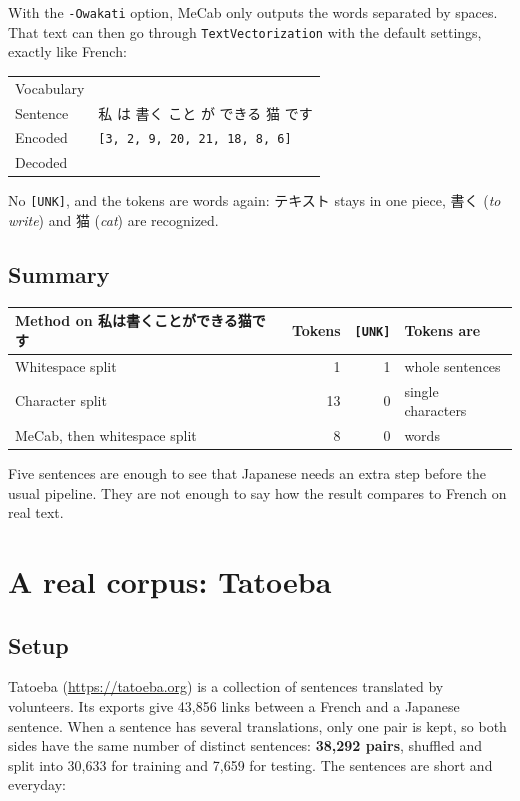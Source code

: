 \documentclass[11pt,a4paper]{article}
\makeatletter
\newcommand\code[1]{\texttt{#1}}
\newenvironment{result}
  {\par\smallskip\noindent\begin{tabular}{@{}l p{0.78\textwidth}@{}}}
  {\end{tabular}\par\smallskip}
\newcommand\row[2]{\textsf{\small\color{muted}#1} & #2 \\[3pt]}
\makeatother
\begin{document}
With the \code{-Owakati} option, MeCab only outputs the words separated by
spaces. That text can then go through \code{TextVectorization} with the default
settings, exactly like French:

\begin{result}
  \row{Vocabulary}{\tokens[ja]{UNK|は|私|我|テキスト|です|あり|猫|書く|思う|別|作家|ん|ゆえ|ませ|の|に|できる|で|こと|が|、}}
  \row{Sentence}{私 は 書く こと が できる 猫 です}
  \row{Encoded}{\code{[3, 2, 9, 20, 21, 18, 8, 6]}}
  \row{Decoded}{\tokens[ja]{私|は|書く|こと|が|できる|猫|です}}
\end{result}

No \code{[UNK]}, and the tokens are words again: テキスト stays in one piece,
書く (\emph{to write}) and 猫 (\emph{cat}) are recognized.

\subsection{Summary}

\begin{table}[H]
\centering
\begin{tabular}{l r r l}
  \toprule
  Method on 私は書くことができる猫です & Tokens & \code{[UNK]} & Tokens are \\
  \midrule
  Whitespace split & 1 & 1 & whole sentences \\
  Character split & 13 & 0 & single characters \\
  MeCab, then whitespace split & 8 & 0 & words \\
  \bottomrule
\end{tabular}
\end{table}

Five sentences are enough to see that Japanese needs an extra step before the
usual pipeline. They are not enough to say how the result compares to French
on real text.

\section{A real corpus: Tatoeba}

\subsection{Setup}

Tatoeba (\url{https://tatoeba.org}) is a collection of sentences translated by
volunteers. Its exports give 43{,}856 links between a French and a Japanese
sentence. When a sentence has several translations, only one pair is kept, so
both sides have the same number of distinct sentences: \textbf{38{,}292 pairs},
shuffled and split into 30{,}633 for training and 7{,}659 for testing. The
sentences are short and everyday:
\end{document}
